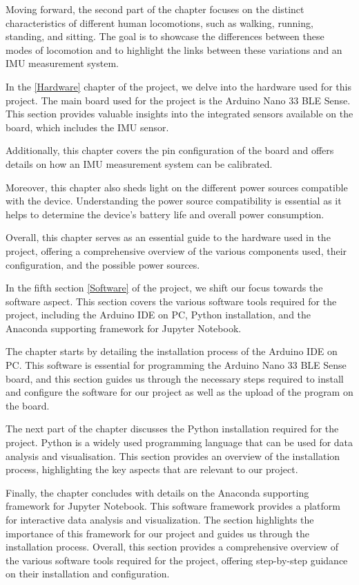 Moving forward, the second part of the chapter focuses on the distinct characteristics of different human locomotions, such as walking, running, standing, and sitting. The goal is to showcase the differences between these modes of locomotion and to highlight the links between these variations and an IMU measurement system.  
 
In the  \ref{Hardware} chapter of the project, we delve into the hardware used for this project. The main board used for the project is the Arduino Nano 33 BLE Sense. This section provides valuable insights into the integrated sensors available on the board, which includes the IMU sensor.
 
Additionally, this chapter covers the pin configuration of the board and offers details on how an IMU measurement system can be calibrated. 

Moreover, this chapter also sheds light on the different power sources compatible with the device. Understanding the power source compatibility is essential as it helps to determine the device's battery life and overall power consumption.
 
Overall, this chapter serves as an essential guide to the hardware used in the project, offering a comprehensive overview of the various components used, their configuration, and the possible power sources.
 
 
In the fifth section \ref{Software} of the project, we shift our focus towards the software aspect. This section covers the various software tools required for the project, including the Arduino IDE on PC, Python installation, and the Anaconda supporting framework for Jupyter Notebook.
 
The chapter starts by detailing the installation process of the Arduino IDE on PC. This software is essential for programming the Arduino Nano 33 BLE Sense board, and this section guides us through the necessary steps required to install and configure the software for our project as well as the upload of the program on the board.
 
The next part of the chapter discusses the Python installation required for the project. Python is a widely used programming language that can be used for data analysis and visualisation. 
This section provides an overview of the installation process, highlighting the key aspects that are relevant to our project.
 
Finally, the chapter concludes with details on the Anaconda supporting framework for Jupyter Notebook. This software framework provides a platform for interactive data analysis and visualization. The section highlights the importance of this framework for our project and guides us through the installation process.
 Overall, this section provides a comprehensive overview of the various software tools required for the project, offering step-by-step guidance on their installation and configuration.

